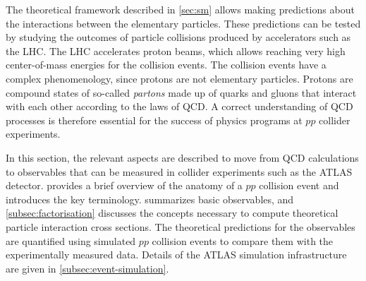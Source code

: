 The theoretical framework described in \cref{sec:sm} allows making predictions about the interactions between the elementary particles. 
These predictions can be tested by studying the outcomes of particle collisions produced by accelerators such as the LHC. 
The LHC accelerates proton beams, which allows reaching very high center-of-mass energies for the collision events. 
The collision events have a complex phenomenology, since protons are not elementary particles.
Protons are compound states of so-called \emph{partons} made up of quarks and gluons that interact with each other according to the laws of QCD.
A correct understanding of QCD processes is therefore essential for the success of physics programs at $pp$ collider experiments.

In this section, the relevant aspects are described to move from QCD calculations to observables that can be measured in collider experiments such as the ATLAS detector.
 provides a brief overview of the anatomy of a $pp$ collision event and introduces the key terminology.  summarizes basic observables, and \cref{subsec:factorisation} discusses the concepts necessary to compute theoretical particle interaction cross sections.
The theoretical predictions for the observables are quantified using simulated $pp$ collision events to compare them with the experimentally measured data. Details of the ATLAS simulation infrastructure are given in \cref{subsec:event-simulation}. 




